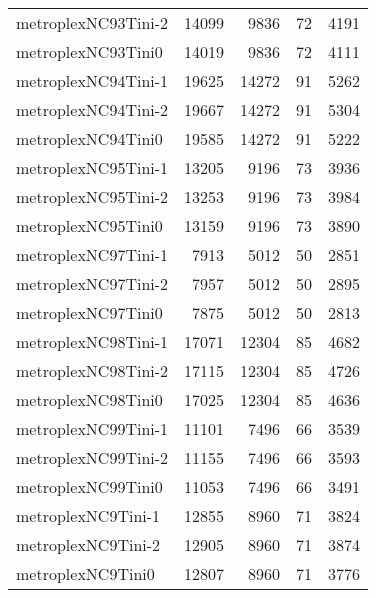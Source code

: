 \begin{tabular}{lrrrr}
metroplexNC93Tini-2 & 14099 & 9836 & 72 & 4191 \\
metroplexNC93Tini0 & 14019 & 9836 & 72 & 4111 \\
metroplexNC94Tini-1 & 19625 & 14272 & 91 & 5262 \\
metroplexNC94Tini-2 & 19667 & 14272 & 91 & 5304 \\
metroplexNC94Tini0 & 19585 & 14272 & 91 & 5222 \\
metroplexNC95Tini-1 & 13205 & 9196 & 73 & 3936 \\
metroplexNC95Tini-2 & 13253 & 9196 & 73 & 3984 \\
metroplexNC95Tini0 & 13159 & 9196 & 73 & 3890 \\
metroplexNC97Tini-1 & 7913 & 5012 & 50 & 2851 \\
metroplexNC97Tini-2 & 7957 & 5012 & 50 & 2895 \\
metroplexNC97Tini0 & 7875 & 5012 & 50 & 2813 \\
metroplexNC98Tini-1 & 17071 & 12304 & 85 & 4682 \\
metroplexNC98Tini-2 & 17115 & 12304 & 85 & 4726 \\
metroplexNC98Tini0 & 17025 & 12304 & 85 & 4636 \\
metroplexNC99Tini-1 & 11101 & 7496 & 66 & 3539 \\
metroplexNC99Tini-2 & 11155 & 7496 & 66 & 3593 \\
metroplexNC99Tini0 & 11053 & 7496 & 66 & 3491 \\
metroplexNC9Tini-1 & 12855 & 8960 & 71 & 3824 \\
metroplexNC9Tini-2 & 12905 & 8960 & 71 & 3874 \\
metroplexNC9Tini0 & 12807 & 8960 & 71 & 3776 \\
\bottomrule
\end{tabular}
